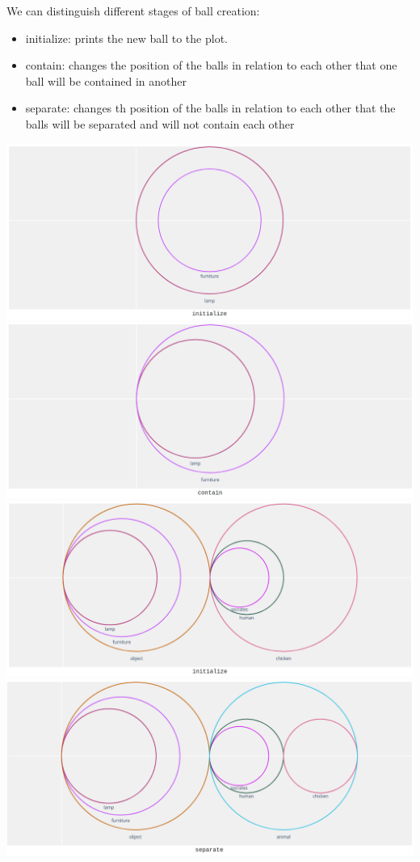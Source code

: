 \documentclass[]{article}
\begin{document}
We can distinguish different stages of ball creation:
\begin{itemize}
	\item initialize: prints the new ball to the plot.
	\item  contain: changes the position of the balls in relation to each other that one ball will be contained in another
	\item  separate: changes th position of the balls in relation to each other that the balls will be separated and will not contain each other
\end{itemize}


\includegraphics[width=\textwidth]{res/animation1.png}
\includegraphics[width=\textwidth]{res/animation2.png}
\includegraphics[width=\textwidth]{res/animation3.png}
\includegraphics[width=\textwidth]{res/animation4.png}
\end{document}
